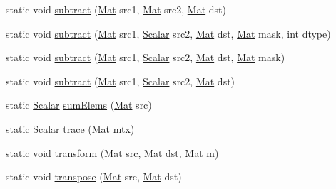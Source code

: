 \begin{DoxyCompactItemize}
\item 
static void \mbox{\hyperlink{classorg_1_1opencv_1_1core_1_1_core_ae6f3f612d92b7907ac2daa9c2f8a2ee2}{subtract}} (\mbox{\hyperlink{classorg_1_1opencv_1_1core_1_1_mat}{Mat}} src1, \mbox{\hyperlink{classorg_1_1opencv_1_1core_1_1_mat}{Mat}} src2, \mbox{\hyperlink{classorg_1_1opencv_1_1core_1_1_mat}{Mat}} dst)
\item 
static void \mbox{\hyperlink{classorg_1_1opencv_1_1core_1_1_core_abf10e2e2d74d5e9bc9785dcda5933ea9}{subtract}} (\mbox{\hyperlink{classorg_1_1opencv_1_1core_1_1_mat}{Mat}} src1, \mbox{\hyperlink{classorg_1_1opencv_1_1core_1_1_scalar}{Scalar}} src2, \mbox{\hyperlink{classorg_1_1opencv_1_1core_1_1_mat}{Mat}} dst, \mbox{\hyperlink{classorg_1_1opencv_1_1core_1_1_mat}{Mat}} mask, int dtype)
\item 
static void \mbox{\hyperlink{classorg_1_1opencv_1_1core_1_1_core_a5a5060e06b78859e4f22f964ee6dac4d}{subtract}} (\mbox{\hyperlink{classorg_1_1opencv_1_1core_1_1_mat}{Mat}} src1, \mbox{\hyperlink{classorg_1_1opencv_1_1core_1_1_scalar}{Scalar}} src2, \mbox{\hyperlink{classorg_1_1opencv_1_1core_1_1_mat}{Mat}} dst, \mbox{\hyperlink{classorg_1_1opencv_1_1core_1_1_mat}{Mat}} mask)
\item 
static void \mbox{\hyperlink{classorg_1_1opencv_1_1core_1_1_core_a51ebf388c0fd37fdaf07cd30cd54c8ea}{subtract}} (\mbox{\hyperlink{classorg_1_1opencv_1_1core_1_1_mat}{Mat}} src1, \mbox{\hyperlink{classorg_1_1opencv_1_1core_1_1_scalar}{Scalar}} src2, \mbox{\hyperlink{classorg_1_1opencv_1_1core_1_1_mat}{Mat}} dst)
\item 
static \mbox{\hyperlink{classorg_1_1opencv_1_1core_1_1_scalar}{Scalar}} \mbox{\hyperlink{classorg_1_1opencv_1_1core_1_1_core_a3c40c8e48917ad9a27fa45674bff78a3}{sum\+Elems}} (\mbox{\hyperlink{classorg_1_1opencv_1_1core_1_1_mat}{Mat}} src)
\item 
static \mbox{\hyperlink{classorg_1_1opencv_1_1core_1_1_scalar}{Scalar}} \mbox{\hyperlink{classorg_1_1opencv_1_1core_1_1_core_a9c17a12158c59ea65c662cac491c28c3}{trace}} (\mbox{\hyperlink{classorg_1_1opencv_1_1core_1_1_mat}{Mat}} mtx)
\item 
static void \mbox{\hyperlink{classorg_1_1opencv_1_1core_1_1_core_a221e7697d1a57961ee8a843b7aa05b75}{transform}} (\mbox{\hyperlink{classorg_1_1opencv_1_1core_1_1_mat}{Mat}} src, \mbox{\hyperlink{classorg_1_1opencv_1_1core_1_1_mat}{Mat}} dst, \mbox{\hyperlink{classorg_1_1opencv_1_1core_1_1_mat}{Mat}} m)
\item 
static void \mbox{\hyperlink{classorg_1_1opencv_1_1core_1_1_core_a4536de6a43f5dfb4d4ba1bf24735696a}{transpose}} (\mbox{\hyperlink{classorg_1_1opencv_1_1core_1_1_mat}{Mat}} src, \mbox{\hyperlink{classorg_1_1opencv_1_1core_1_1_mat}{Mat}} dst)

\end{DoxyCompactItemize}
